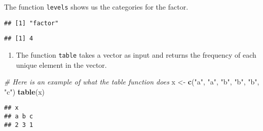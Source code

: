 \documentclass[]{article}
\newenvironment{Shaded}{\begin{snugshade}}{\end{snugshade}}
\newcommand{\CommentTok}[1]{\textcolor[rgb]{0.56,0.35,0.01}{\textit{#1}}}
\newcommand{\KeywordTok}[1]{\textcolor[rgb]{0.13,0.29,0.53}{\textbf{#1}}}
\newcommand{\NormalTok}[1]{#1}
\newcommand{\OperatorTok}[1]{\textcolor[rgb]{0.81,0.36,0.00}{\textbf{#1}}}
\newcommand{\StringTok}[1]{\textcolor[rgb]{0.31,0.60,0.02}{#1}}
\providecommand{\tightlist}{%
  \setlength{\itemsep}{0pt}\setlength{\parskip}{0pt}}
\begin{document}
The function \texttt{levels} shows us the categories for the factor.

\begin{Shaded}
\end{Shaded}

\begin{verbatim}
## [1] "factor"
\end{verbatim}

\begin{Shaded}
\end{Shaded}

\begin{verbatim}
## [1] 4
\end{verbatim}

\begin{enumerate}
\def\labelenumi{\arabic{enumi}.}
\setcounter{enumi}{5}
\tightlist
\item
  The function \texttt{table} takes a vector as input and returns the
  frequency of each unique element in the vector.
\end{enumerate}

\begin{Shaded}
\begin{Highlighting}[]
\CommentTok{# Here is an example of what the table function does}
\NormalTok{x <-}\StringTok{ }\KeywordTok{c}\NormalTok{(}\StringTok{"a"}\NormalTok{, }\StringTok{"a"}\NormalTok{, }\StringTok{"b"}\NormalTok{, }\StringTok{"b"}\NormalTok{, }\StringTok{"b"}\NormalTok{, }\StringTok{"c"}\NormalTok{)}
\KeywordTok{table}\NormalTok{(x)}
\end{Highlighting}
\end{Shaded}

\begin{verbatim}
## x
## a b c 
## 2 3 1
\end{verbatim}

\begin{Shaded}
\end{Shaded}
\end{document}
